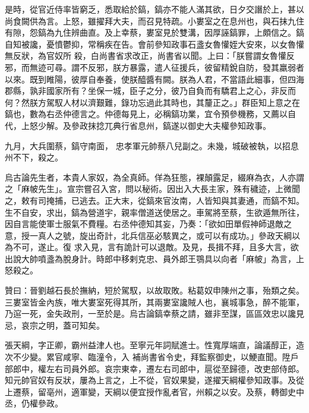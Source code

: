 \begin{pinyinscope}
 是時，從官近侍率皆窮乏，悉取給於鎬，鎬亦不能人滿其欲，日夕交譖於上，甚以尚食闕供為言。上怒，雖擢拜大夫，而召見特疏。小婁室之在息州也，與石抹九住有隙，怨鎬為九住辨曲直。及上幸蔡，婁室見於雙溝，因厚誣鎬罪，上頗信之。鎬自知被讒，憂憤鬱抑，常稱疾在告。會前參知政事石盞女魯懽姪大安來，以女魯懽無反狀，為官奴所
 殺，白尚書省求改正，尚書省以聞。上曰：「朕嘗謂女魯懽反邪，而無迹可尋。謂不反邪，朕方暴露，遣人征援兵，彼留精銳自防，發其羸弱者以來。既到睢陽，彼厚自奉養，使朕醯醬有闕。朕為人君，不當語此細事，但四海郡縣，孰非國家所有？坐保一城，臣子之分，彼乃自負而有驕君上之心，非反而何？然朕方駕馭人材以濟艱難，錄功忘過此其時也，其釐正之。」群臣知上意之在鎬也，數為右丞仲德言之。仲德每見上，必稱鎬功業，宜令預參機務，又薦以自代，上怒少解。及參政抹捻兀典行省息州，鎬遂以御史大夫權參知政事。



 九月，大兵圍蔡，鎬守南面，
 忠孝軍元帥蔡八兒副之。未幾，城破被執，以招息州不下，殺之。



 烏古論先生者，本貴人家奴，為全真師。佯為狂態，裸顛露足，綴麻為衣，人亦謂之「麻帔先生」。宣宗嘗召入宮，問以秘術。因出入大長主家，殊有穢迹，上微聞之，敕有司掩捕，已逃去。正大末，從鎬來官汝南，人皆知與其妻通，而鎬不知。生不自安，求出，鎬為營道宇，親率僧道送使居之。車駕將至蔡，生欲遁無所往，因自言能使軍士服氣不費糧。右丞仲德知其妄，乃奏：「欲如田單假神師退敵之意，授一真人之號，旋出奇計，北兵信巫必駭異之，或可以有成功。」參政天綱以為不可，遂止。復
 求入見，言有詭計可以退敵。及見，長揖不拜，且多大言，欲出說大帥噴盞為脫身計。時郎中移剌克忠、員外郎王鶚具以向者「麻帔」為言，上怒殺之。



 贊曰：晉劉越石長於撫納，短於駕馭，以故取敗。粘葛奴申陳州之事，殆類之矣。三婁室皆金內族，唯大婁室死得其所，其兩婁室讒賊人也，襄城事急，醉不能軍，乃逭一死，金失政刑，一至於是。烏古論鎬幸蔡之請，雖非至謀，區區效忠以讒見忌，哀宗之明，蓋可知矣。



 張天綱，字正卿，霸州益津人也。至寧元年詞賦進士。性寬厚端直，論議醇正，造次不少變。累官咸寧、臨潼令，入
 補尚書省令史，拜監察御史，以鯁直聞。陞戶部郎中，權左右司員外郎。哀宗東幸，遷左右司郎中，扈從至歸德，改吏部侍郎。知元帥官奴有反狀，屢為上言之，上不從，官奴果變，遂擢天綱權參知政事。及從上遷蔡，留亳州，適軍變，天綱以便宜授作亂者官，州賴之以安。及蔡，轉御史中丞，仍權參政。




\end{pinyinscope}
